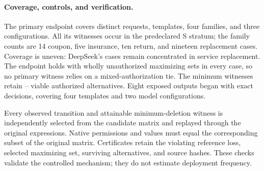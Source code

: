 \begin{table}[!t]
\centering\small\setlength{\tabcolsep}{3pt}

\caption{Availability outcomes over the planned cohort. Hidden counts safe purchases concealing false admissions; Exposed requires a transition within eight removals with a viable authorized alternative. Requests and Templates count exposure coverage.}
\label{tab:availability-models}
\end{table}

\begin{table}[t]
\centering\small\setlength{\tabcolsep}{3pt}

\caption{All 20 templates, including zero-event structures. Percentages use each template's planned cohort across models. Shared requests and numerical variants are not independent logical structures.}
\label{tab:availability-templates}
\end{table}

\paragraph{Coverage, controls, and verification.}
The primary endpoint covers \AvailExposedRequests{} distinct requests, \AvailExposedTemplates{} templates, four families, and three configurations. All its witnesses occur in the predeclared S stratum; the family counts are 14 coupon, five insurance, ten return, and nineteen replacement cases. Coverage is uneven: DeepSeek's cases remain concentrated in service replacement. The endpoint holds with wholly unauthorized maximizing sets in every case, so no primary witness relies on a mixed-authorization tie. The minimum witnesses retain \AvailBackupMin{}--\AvailBackupMax{} viable authorized alternatives. Eight exposed outputs began with exact decisions, covering four templates and two model configurations.

Every observed transition and attainable minimum-deletion witness is independently selected from the candidate matrix and replayed through the original expressions. Native permissions and values must equal the corresponding subset of the original matrix. Certificates retain the violating reference loss, selected maximizing set, surviving alternatives, and source hashes. These checks validate the controlled mechanism; they do not estimate deployment frequency.

\begin{table}[!t]
\centering\small\setlength{\tabcolsep}{3pt}

\caption{Availability controls as percentages of all planned trials. Directed rows count whether a transition occurs at any prefix within the budget; random rows average observed transition fractions over 32 draws per trial. Safe-to-unsafe requires a viable authorized alternative. Forward and reverse cumulative events need not occur at the same prefix.}
\label{tab:availability-controls}
\end{table}

